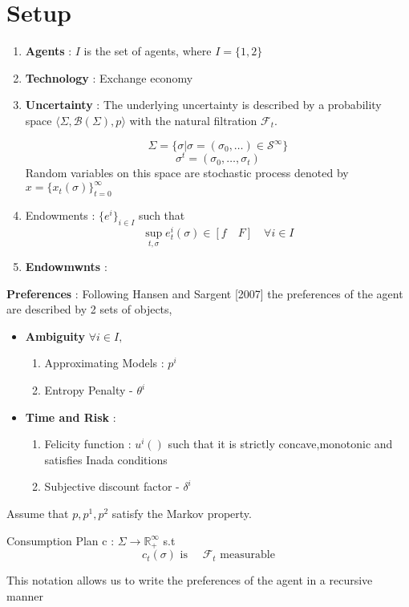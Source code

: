 \documentclass[12pt]{article}
\begin{document}
\section{Setup}
	\begin{enumerate}
		\item \textbf{Agents}  : $I$ is the  set of agents, where $I= \{1,2\}$
		\item \textbf{Technology} : Exchange economy
		\item \textbf{Uncertainty}  : The underlying uncertainty is described by a probability space $\langle \Sigma,\mathcal{B}(\Sigma), p \rangle$ with the natural filtration $\mathcal{F}_t$.
		
	\[\Sigma=\{\sigma | \sigma = (\sigma_0,\dots) \in \mathcal{S}^{\infty}\}\]
	\[\sigma^t =(\sigma_0,\dots,\sigma_t)\]
	Random variables on this space are stochastic process denoted by $x=\{x_t(\sigma)\}^{\infty}_{t=0}$		
\item Endowments : $\{e^i\}_{i \in I}$ such that
\[\sup_{t,\sigma} e^{i}_t(\sigma) \in [f \quad F] \quad \forall i \in I\]
	
		\item \textbf{Endowmwnts} :
 	\end{enumerate}
\textbf{Preferences} : Following Hansen and Sargent [2007] the preferences of the agent are described by 2 sets of objects, 
\begin{itemize}
	\item \textbf{Ambiguity}
%	
$\forall i \in I,$
\begin{enumerate}
	\item Approximating Models :   $  p^i $
	\item Entropy Penalty - $\theta^i$ 
\end{enumerate}
\item \textbf{Time and Risk} :
\begin{enumerate}
	\item Felicity function : $u^i()$ such that it is strictly concave,monotonic and satisfies Inada conditions
	\item Subjective discount factor - $\delta^i$
\end{enumerate}
 \end{itemize}

Assume that $p,p^1,p^2$ satisfy the Markov property.

\noindent Consumption Plan  c : $\Sigma \to \mathbb{R}^{\infty}_{+} $ s.t
		\[c_t(\sigma)\text{ is } \quad\mathcal{F}_t \text{ measurable}\]
	
\noindent This notation allows us to write the preferences of the agent in a recursive manner 
\end{document}
